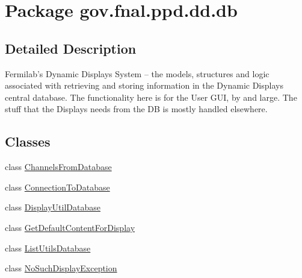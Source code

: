 \hypertarget{namespacegov_1_1fnal_1_1ppd_1_1dd_1_1db}{\section{Package gov.\-fnal.\-ppd.\-dd.\-db}
\label{namespacegov_1_1fnal_1_1ppd_1_1dd_1_1db}
}


\subsection{Detailed Description}
Fermilab's Dynamic Displays System -- the models, structures and logic associated with retrieving and storing information in the Dynamic Displays central database. The functionality here is for the User G\-U\-I, by and large. The stuff that the Displays needs from the D\-B is mostly handled elsewhere.\subsection*{Classes}
\begin{DoxyCompactItemize}
\item 
class \hyperlink{classgov_1_1fnal_1_1ppd_1_1dd_1_1db_1_1ChannelsFromDatabase}{Channels\-From\-Database}
\item 
class \hyperlink{classgov_1_1fnal_1_1ppd_1_1dd_1_1db_1_1ConnectionToDatabase}{Connection\-To\-Database}
\item 
class \hyperlink{classgov_1_1fnal_1_1ppd_1_1dd_1_1db_1_1DisplayUtilDatabase}{Display\-Util\-Database}
\item 
class \hyperlink{classgov_1_1fnal_1_1ppd_1_1dd_1_1db_1_1GetDefaultContentForDisplay}{Get\-Default\-Content\-For\-Display}
\item 
class \hyperlink{classgov_1_1fnal_1_1ppd_1_1dd_1_1db_1_1ListUtilsDatabase}{List\-Utils\-Database}
\item 
class \hyperlink{classgov_1_1fnal_1_1ppd_1_1dd_1_1db_1_1NoSuchDisplayException}{No\-Such\-Display\-Exception}
\end{DoxyCompactItemize}
